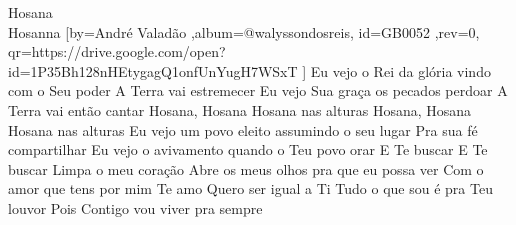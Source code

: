 \beginsong
{Hosana \\Hosanna %
}[by={André Valadão %
},album={@walyssondosreis},
id={GB0052 %
},rev={0}, %
qr={https://drive.google.com/open?id=1P35Bh128nHEtygagQ1onfUnYugH7WSxT %
}]
\beginverse*
Eu vejo o Rei da glória vindo com o Seu poder
A Terra vai estremecer
Eu vejo Sua graça os pecados perdoar
A Terra vai então cantar
\endverse
\beginchorus
Hosana, Hosana
Hosana nas alturas
Hosana, Hosana
Hosana nas alturas
\endchorus
\beginverse*
Eu vejo um povo eleito assumindo o seu lugar
Pra sua fé compartilhar
Eu vejo o avivamento quando o Teu povo orar
E Te buscar
E Te buscar
\endverse
\beginverse*
Limpa o meu coração
Abre os meus olhos pra que eu possa ver
Com o amor que tens por mim
Te amo
\endverse
\beginverse*
Quero ser igual a Ti
Tudo o que sou é pra Teu louvor
Pois Contigo vou viver pra sempre
\endverse

